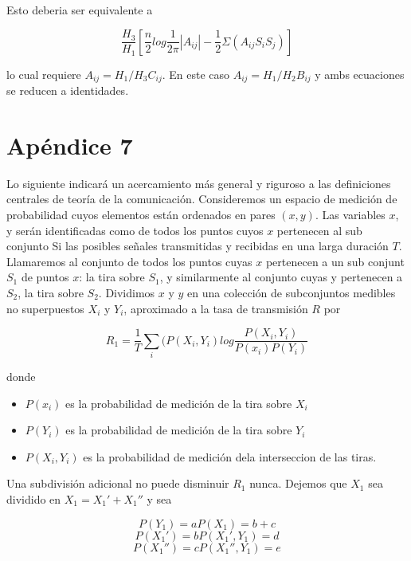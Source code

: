 Esto deberia ser equivalente a
			
\begin{equation} \frac{H_{3}}{H_{1}} [ \frac{n}{2} log \frac{1}{2\pi} | A_{ij} | - \frac{1}{2} \Sigma(A_{ij} S_{i}S_{j})] \end{equation}
				
lo cual requiere $A_{ij} = H_{1}/H_{3} C_{ij}$. En este caso $A_{ij} = H_{1}/H_{2} B_{ij}$ y ambs ecuaciones
se reducen a identidades.

\section{Ap\'endice 7}

Lo siguiente indicar\'a un acercamiento m\'as general y riguroso a las definiciones centrales
de teor\'ia de la comunicaci\'on. Consideremos un espacio de medici\'on de probabilidad cuyos 
elementos est\'an ordenados en pares $(x, y)$. Las variables $x$, y ser\'an identificadas como
de todos los puntos cuyos $x$ pertenecen al sub conjunto Si las posibles señales transmitidas 
y recibidas en una larga duraci\'on $T$. Llamaremos al conjunto de todos los puntos
cuyas $x$ pertenecen a un sub conjunt $S_{1}$ de puntos $x$: la tira sobre $S_{1}$, y similarmente
al conjunto cuyas y pertenecen a $S_{2}$, la tira sobre $S_{2}$. Dividimos $x$ y $y$ en una colecci\'on
de subconjuntos medibles no superpuestos $X_{i}$ y $Y_{i}$, aproximado a la tasa de transmisi\'on
$R$ por

\begin{equation} R_{1} = \frac{1}{T} \displaystyle\sum_{i}(P(X_{i},Y_{i}) log \frac{P(X_{i}, Y_{i})}{P(x_{i})P(Y_{i})} \end{equation}
				   
donde
\begin{itemize}
		\item $P(x_{i})$ es la probabilidad de medici\'on de la tira sobre $X_{i}$
		\item $P(Y_{i})$ es la probabilidad de medici\'on de la tira sobre $Y_{i}$
		\item $P(X_{i},Y_{i})$ es la probabilidad de medici\'on dela interseccion de las tiras.
\end{itemize}
		
Una subdivisi\'on adicional no puede disminuir $R_{1}$ nunca. Dejemos que $X_{1}$ sea dividido en
$X_{1} = X_{1}' + X_{1}''$ y sea

\begin{equation} P(Y_{1}) = a		P(X_{1}) = b + c \end{equation}
\begin{equation} P(X_{1}') = b		P(X_{1}', Y_{1}) = d \end{equation}
\begin{equation} P(X_{1}'') = c		P(X_{1}'', Y_{1}) = e \end{equation}
				


